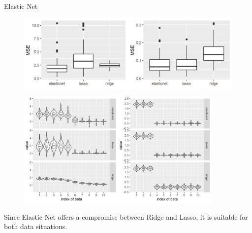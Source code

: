 \documentclass[11pt,compress,t,notes=noshow, xcolor=table]{beamer}
\begin{document}
\begin{vbframe} {Elastic Net}
\begin{figure}
\includegraphics[width=1\textwidth]{figure/enet_lasso_ridge_mse.png}\\
\end{figure}

\framebreak

\begin{figure}
\includegraphics[width=0.9\textwidth]{figure/enet_tradeoff.png}\\
\end{figure}


\normalsize
Since Elastic Net offers a compromise between Ridge and Lasso, it is suitable for both data situations.

\end{vbframe}


\end{document}
